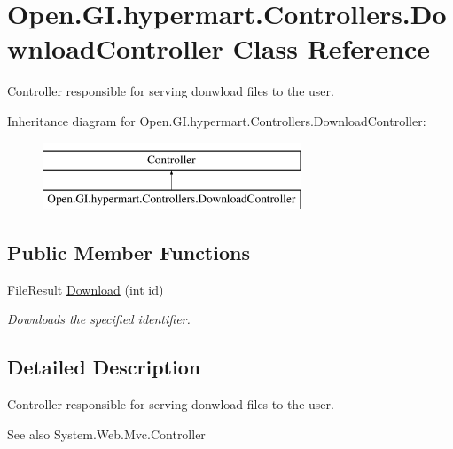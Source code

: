 \hypertarget{class_open_1_1_g_i_1_1hypermart_1_1_controllers_1_1_download_controller}{}\section{Open.\+G\+I.\+hypermart.\+Controllers.\+Download\+Controller Class Reference}
\label{class_open_1_1_g_i_1_1hypermart_1_1_controllers_1_1_download_controller}


Controller responsible for serving donwload files to the user.  


Inheritance diagram for Open.\+G\+I.\+hypermart.\+Controllers.\+Download\+Controller\+:\begin{figure}[H]
\begin{center}
\leavevmode
\includegraphics[height=2.000000cm]{class_open_1_1_g_i_1_1hypermart_1_1_controllers_1_1_download_controller}
\end{center}
\end{figure}
\subsection*{Public Member Functions}
\begin{DoxyCompactItemize}
\item 
File\+Result \hyperlink{class_open_1_1_g_i_1_1hypermart_1_1_controllers_1_1_download_controller_a272d3e80defa78e91555596d44891c47}{Download} (int id)
\begin{DoxyCompactList}\small\item\em Downloads the specified identifier. \end{DoxyCompactList}\end{DoxyCompactItemize}


\subsection{Detailed Description}
Controller responsible for serving donwload files to the user. 

\begin{DoxySeeAlso}{See also}
System.\+Web.\+Mvc.\+Controller


\end{DoxySeeAlso}


